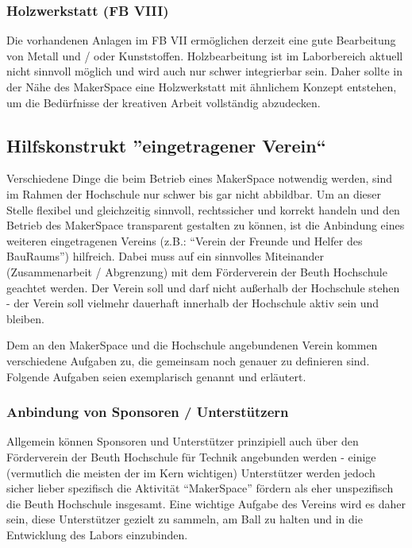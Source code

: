 \documentclass[parskip=half,headsepline,footsepline,titlepage]{scrartcl}
\begin{document}
\subsubsection{Holzwerkstatt (FB VIII)}
Die vorhandenen Anlagen im FB VII ermöglichen derzeit eine gute Bearbeitung von Metall und / oder Kunststoffen. Holzbearbeitung ist im Laborbereich aktuell nicht sinnvoll möglich und wird auch nur schwer integrierbar sein. Daher sollte in der Nähe des MakerSpace eine Holzwerkstatt mit ähnlichem Konzept entstehen, um die Bedürfnisse der kreativen Arbeit vollständig abzudecken.



\subsection{Hilfskonstrukt ''eingetragener Verein``}
Verschiedene Dinge die beim Betrieb eines MakerSpace notwendig werden, sind im Rahmen der Hochschule nur schwer bis gar nicht abbildbar. Um an dieser Stelle flexibel und gleichzeitig sinnvoll, rechtssicher und korrekt handeln und den Betrieb des MakerSpace transparent gestalten zu können, ist die Anbindung eines weiteren eingetragenen Vereins (z.B.: ``Verein der Freunde und Helfer des BauRaums'') hilfreich. Dabei muss auf ein sinnvolles Miteinander (Zusammenarbeit / Abgrenzung) mit dem Förderverein der Beuth Hochschule geachtet werden.
Der Verein soll und darf nicht außerhalb der Hochschule stehen - der Verein soll vielmehr dauerhaft innerhalb der Hochschule aktiv sein und bleiben.

Dem an den MakerSpace und die Hochschule angebundenen Verein kommen verschiedene Aufgaben zu, die gemeinsam noch genauer zu definieren sind. Folgende Aufgaben seien exemplarisch genannt und erläutert.

\subsubsection{Anbindung von Sponsoren / Unterstützern\label{sssec:sponsoren}}
Allgemein können Sponsoren und Unterstützer prinzipiell auch über den Förderverein der Beuth Hochschule für Technik angebunden werden - einige (vermutlich die meisten der im Kern wichtigen) Unterstützer werden jedoch sicher lieber spezifisch die Aktivität ``MakerSpace'' fördern als eher unspezifisch die Beuth Hochschule insgesamt. Eine wichtige Aufgabe des Vereins wird es daher sein, diese Unterstützer gezielt zu sammeln, am Ball zu halten und in die Entwicklung des Labors einzubinden.
\end{document}

